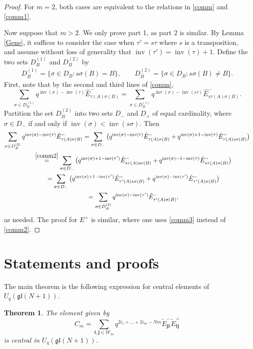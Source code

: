 \documentclass[11pt]{article}
\numberwithin{equation}{section}
\numberwithin{equation}{section}
\newtheorem{Theorem}{Theorem}[section]
\DeclareMathOperator{\inv}{inv}
\newcommand{\Uqgl}{{U_q(\mathfrak{gl}(N+1))}}
\newcommand{\ii}{{\mathbf{i}}}
\newcommand{\jj}{{\mathbf{j}}}
\begin{document}
\begin{proof}
	For $m=2$, both cases are equivalent to the relations in \eqref{comm} and \eqref{comm1}.
	
	Now suppose that $ m>2$. We only prove part 1, as part 2 is similar. By Lemma \ref{Gene}, it suffices to consider the case when $\tau'=s\tau$ where $s$ is a transposition, and assume without loss of generality that $\inv(\tau')= \inv(\tau)+1$. Define the two sets $D_B^{(1)}$ and $D_B^{(2)}$ by
	\begin{gather*}
		D_B^{(1)}= \{ \sigma \in D_B \colon s \sigma(B)=B \},\qquad
		D_B^{(2)}= \{ \sigma \in D_B \colon s \sigma(B) \neq B \}.
	\end{gather*}	
	First, note that by the second and third lines of \eqref{comm},
\[
	\sum_{\sigma\in D_B^{(1)}} q^{\inv(\sigma)-\inv(\tau)} \hat{E}^-_{\tau(A) \sigma (B)} = \sum_{\sigma\in D_B^{(1)}} q^{\inv(\sigma)-\inv(s\tau)} \hat{E}^-_{s \tau(A) \sigma (B)} .
\]
	Partition the set $D_B^{(2)}$ into two sets $D_-$ and $D_+$ of equal cardinality, where $\sigma \in D_-$ if and only if $\inv(\sigma) < \inv(s \sigma)$. Then
	\begin{gather*}
	\sum_{\sigma\in D_B^{(2)}} q^{\inv(\sigma)-\inv(\tau)} \hat{E}^-_{\tau(A) \sigma (B)} = \sum_{\sigma \in D_-} \big( q^{\inv(\sigma)-\inv(\tau)} \hat{E}^-_{\tau(A) \sigma (B)} + q^{\inv(\sigma)+1-\inv(\tau)} \hat{E}^-_{\tau(A) s\sigma (B)} \big) \\
\qquad \stackrel{\eqref{comm2}}{=} \sum_{\sigma \in D_-} \big( q^{\inv(\sigma)+1-\inv(\tau')} \hat{E}^-_{s\tau(A) s\sigma (B)} + q^{\inv(\sigma)-1-\inv(\tau)} \hat{E}^-_{s\tau(A) \sigma (B)} \big)\\
\qquad =\sum_{\sigma \in D_-} \big( q^{\inv(\sigma)+1-\inv(\tau')} \hat{E}^-_{\tau'(A) s\sigma (B)} + q^{\inv(\sigma)-\inv(\tau')} \hat{E}^-_{\tau'(A) \sigma (B)}\big)\\
\qquad =\sum_{\sigma\in D_B^{(2)}} q^{\inv(\sigma)-\inv(\tau')} \hat{E}^-_{\tau'(A) \sigma (B)} ,
	\end{gather*}
	as needed.
	The proof for $E^+$ is similar, where one uses \eqref{comm3} instead of \eqref{comm2}.
\end{proof}


\section{Statements and proofs}

The main theorem is the following expression for central elements of $\Uqgl$.
\begin{Theorem}\label{Main}
	The element given by
\begin{equation*}
C_m=\sum_{\ii,\jj \in \mathcal{W}_m} q^{ 2i_1 + \dots + 2i_m-Nm} \tilde{E}_{\jj \ii}^-\tilde{E}_{\ii\jj}^+
\end{equation*}
is central in $ \Uqgl $.
\end{Theorem}
\end{document}
